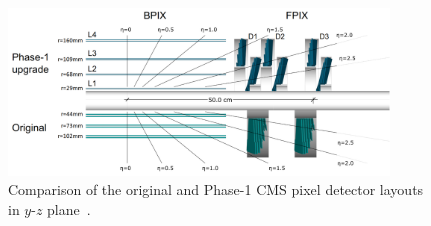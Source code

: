\begin{figure}
\centering
\includegraphics[width=0.9\textwidth]{figures/lhc_and_cms/pixels_layout_comparison.png}
\caption{Comparison of the original and Phase-1 CMS pixel detector layouts in $y$-$z$ plane~\cite{cms_phase1_pixels}.}
\label{pixels_original_vs_phase1}
\end{figure}